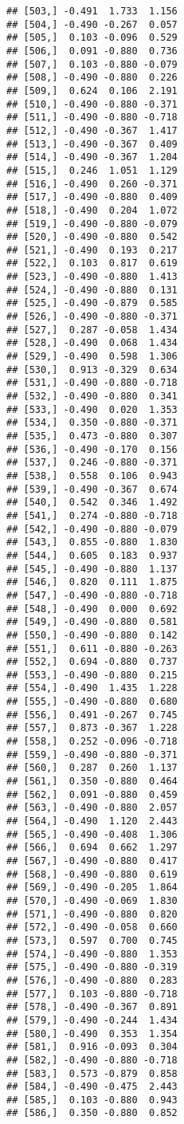 \documentclass[
]{article}
\begin{document}
\begin{verbatim}
## [503,] -0.491  1.733  1.156
## [504,] -0.490 -0.267  0.057
## [505,]  0.103 -0.096  0.529
## [506,]  0.091 -0.880  0.736
## [507,]  0.103 -0.880 -0.079
## [508,] -0.490 -0.880  0.226
## [509,]  0.624  0.106  2.191
## [510,] -0.490 -0.880 -0.371
## [511,] -0.490 -0.880 -0.718
## [512,] -0.490 -0.367  1.417
## [513,] -0.490 -0.367  0.409
## [514,] -0.490 -0.367  1.204
## [515,]  0.246  1.051  1.129
## [516,] -0.490  0.260 -0.371
## [517,] -0.490 -0.880  0.409
## [518,] -0.490  0.204  1.072
## [519,] -0.490 -0.880 -0.079
## [520,] -0.490 -0.880  0.542
## [521,] -0.490  0.193  0.217
## [522,]  0.103  0.817  0.619
## [523,] -0.490 -0.880  1.413
## [524,] -0.490 -0.880  0.131
## [525,] -0.490 -0.879  0.585
## [526,] -0.490 -0.880 -0.371
## [527,]  0.287 -0.058  1.434
## [528,] -0.490  0.068  1.434
## [529,] -0.490  0.598  1.306
## [530,]  0.913 -0.329  0.634
## [531,] -0.490 -0.880 -0.718
## [532,] -0.490 -0.880  0.341
## [533,] -0.490  0.020  1.353
## [534,]  0.350 -0.880 -0.371
## [535,]  0.473 -0.880  0.307
## [536,] -0.490 -0.170  0.156
## [537,]  0.246 -0.880 -0.371
## [538,]  0.558  0.106  0.943
## [539,] -0.490 -0.367  0.674
## [540,]  0.542  0.346  1.492
## [541,]  0.274 -0.880 -0.718
## [542,] -0.490 -0.880 -0.079
## [543,]  0.855 -0.880  1.830
## [544,]  0.605  0.183  0.937
## [545,] -0.490 -0.880  1.137
## [546,]  0.820  0.111  1.875
## [547,] -0.490 -0.880 -0.718
## [548,] -0.490  0.000  0.692
## [549,] -0.490 -0.880  0.581
## [550,] -0.490 -0.880  0.142
## [551,]  0.611 -0.880 -0.263
## [552,]  0.694 -0.880  0.737
## [553,] -0.490 -0.880  0.215
## [554,] -0.490  1.435  1.228
## [555,] -0.490 -0.880  0.680
## [556,]  0.491 -0.267  0.745
## [557,]  0.873 -0.367  1.228
## [558,]  0.252 -0.096 -0.718
## [559,] -0.490 -0.880 -0.371
## [560,]  0.287  0.260  1.137
## [561,]  0.350 -0.880  0.464
## [562,]  0.091 -0.880  0.459
## [563,] -0.490 -0.880  2.057
## [564,] -0.490  1.120  2.443
## [565,] -0.490 -0.408  1.306
## [566,]  0.694  0.662  1.297
## [567,] -0.490 -0.880  0.417
## [568,] -0.490 -0.880  0.619
## [569,] -0.490 -0.205  1.864
## [570,] -0.490 -0.069  1.830
## [571,] -0.490 -0.880  0.820
## [572,] -0.490 -0.058  0.660
## [573,]  0.597  0.700  0.745
## [574,] -0.490 -0.880  1.353
## [575,] -0.490 -0.880 -0.319
## [576,] -0.490 -0.880  0.283
## [577,]  0.103 -0.880 -0.718
## [578,] -0.490 -0.367  0.891
## [579,] -0.490 -0.244  1.434
## [580,] -0.490  0.353  1.354
## [581,]  0.916 -0.093  0.304
## [582,] -0.490 -0.880 -0.718
## [583,]  0.573 -0.879  0.858
## [584,] -0.490 -0.475  2.443
## [585,]  0.103 -0.880  0.943
## [586,]  0.350 -0.880  0.852

\end{verbatim}
\end{document}
